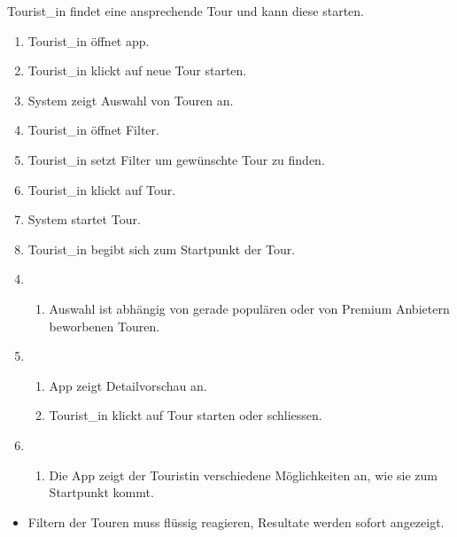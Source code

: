\label{erfolgsgarantie}
Tourist\_in findet eine ansprechende Tour und kann diese starten.


\label{standardablauf}
\begin{enumerate}
  \item Tourist\_in öffnet app.
  \item Tourist\_in klickt auf neue Tour starten.
  \item System zeigt Auswahl von Touren an.
  \item Tourist\_in öffnet Filter.
  \item Tourist\_in setzt Filter um gewünschte Tour zu finden.
  \item Tourist\_in klickt auf Tour.
  \item System startet Tour.
  \item Tourist\_in begibt sich zum Startpunkt der Tour.
\end{enumerate}


\label{erweiterungen}
\begin{enumerate}
  \setcounter{enumi}{3}
  \item
    \begin{enumerate}
      \item Auswahl ist abhängig von gerade populären oder von Premium Anbietern beworbenen Touren.
    \end{enumerate}

  \setcounter{enumi}{6}
  \item
    \begin{enumerate}
      \item App zeigt Detailvorschau an.
      \item Tourist\_in klickt auf Tour starten oder schliessen.
    \end{enumerate}

  \setcounter{enumi}{8}
  \item
    \begin{enumerate}
      \item Die App zeigt der Touristin verschiedene Möglichkeiten an, wie sie zum Startpunkt kommt.
    \end{enumerate}
\end{enumerate}


\label{spezielle-anforderungen}
\begin{itemize}
  \item Filtern der Touren muss flüssig reagieren, Resultate werden sofort angezeigt.
\end{itemize}



